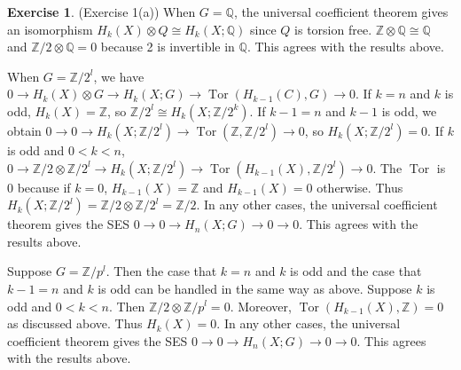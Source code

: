 \documentclass[12pt, psamsfonts]{amsart}
\theoremstyle{definition}
\newtheorem*{exer}{Exercise}
\theoremstyle{remark}
\DeclareMathOperator{\Tor}{Tor}
\numberwithin{equation}{section}
\begin{document}
\begin{exer}{(Exercise 1(a))}
  When $G = \mathbb{Q}$, the universal coefficient theorem gives an isomorphism $H_k(X) \otimes Q \cong H_k(X; \mathbb{Q})$ since $Q$ is torsion free.
  $\mathbb{Z} \otimes \mathbb{Q} \cong \mathbb{Q}$ and $\mathbb{Z} / 2 \otimes \mathbb{Q} = 0$ because 2 is invertible in $\mathbb{Q}$.
  This agrees with the results above.

  When $G = \mathbb{Z} / 2^l$, we have $0 \rightarrow H_k(X) \otimes G \rightarrow H_k(X; G) \rightarrow \Tor(H_{k - 1}(C), G) \rightarrow 0$.
  If $k = n$ and $k$ is odd, $H_k(X) = \mathbb{Z}$, so $\mathbb{Z} / 2^l \cong H_k(X; \mathbb{Z} / 2^k)$.
  If $k - 1 = n$ and $k - 1$ is odd, we obtain $0 \rightarrow 0 \rightarrow H_k(X; \mathbb{Z} / 2^l) \rightarrow \Tor(\mathbb{Z}, \mathbb{Z} / 2^l) \rightarrow 0$, so $H_k(X; \mathbb{Z} / 2^l) = 0$.
  If $k$ is odd and $0 < k < n$, $0 \rightarrow \mathbb{Z} / 2 \otimes \mathbb{Z} / 2^l \rightarrow H_k(X; \mathbb{Z} / 2^l) \rightarrow \Tor(H_{k - 1}(X), \mathbb{Z} / 2^l) \rightarrow 0$.
  The $\Tor$ is 0 because if $k = 0$, $H_{k - 1}(X) = \mathbb{Z}$ and $H_{k - 1}(X) = 0$ otherwise.
  Thus $H_k(X; \mathbb{Z} / 2^l) = \mathbb{Z} / 2 \otimes \mathbb{Z} / 2^l = \mathbb{Z} / 2$.
  In any other cases, the universal coefficient theorem gives the SES $0 \rightarrow 0 \rightarrow H_n(X; G) \rightarrow 0 \rightarrow 0$.
  This agrees with the results above.

  Suppose $G = \mathbb{Z} / p^l$.
  Then the case that $k = n$ and $k$ is odd and the case that $k - 1 = n$ and $k$ is odd can be handled in the same way as above.
  Suppose $k$ is odd and $0 < k < n$.
  Then $\mathbb{Z} / 2 \otimes \mathbb{Z} / p^l = 0$.
  Moreover, $\Tor(H_{k - 1}(X), \mathbb{Z}) = 0$ as discussed above.
  Thus $H_{k}(X) = 0$.
  In any other cases, the universal coefficient theorem gives the SES $0 \rightarrow 0 \rightarrow H_n(X; G) \rightarrow 0 \rightarrow 0$.
  This agrees with the results above.
\end{exer}
\end{document}
